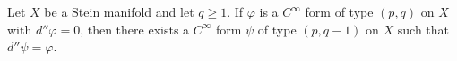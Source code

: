 Let $X$ be a Stein manifold and let $q \geqslant 1$. If $\varphi$ is a $C^\infty$ form of type $(p,q)$ on $X$ with $d''\varphi = 0$, then there exists a $C^\infty$ form $\psi$ of type $(p,q-1)$ on $X$ such that $d''\psi = \varphi$.
